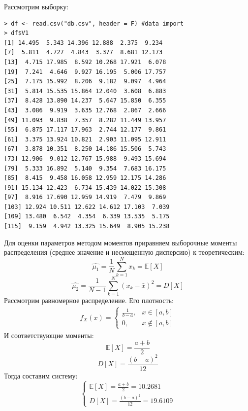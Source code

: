 \documentclass[14pt,a4paper]{scrartcl}
\begin{document}
Рассмотрим выборку:
\begin{verbatim}
> df <- read.csv("db.csv", header = F) #data import
> df$V1
[1] 14.495  5.343 14.396 12.888  2.375  9.234
[7]  5.811  4.727  4.843  3.377  8.681 12.173
[13]  4.715 17.985  8.592 10.268 17.921  6.078
[19]  7.241  4.646  9.927 16.195  5.006 17.757
[25]  7.175 15.992  8.206  9.182  9.097  4.964
[31]  5.814 15.535 15.864 12.040  3.608  6.883
[37]  8.428 13.890 14.237  5.647 15.850  6.355
[43]  3.086  9.919  3.635 12.768  2.867  2.666
[49] 11.093  9.838  7.357  8.282 11.449 13.957
[55]  6.875 17.117 17.963  2.744 12.177  9.861
[61]  3.375 13.924 10.821  2.903 11.095 12.911
[67]  3.878 10.351  8.250 14.186 15.506  5.743
[73] 12.906  9.012 12.767 15.988  9.493 15.694
[79]  5.333 16.892  5.140  9.354  7.683 16.175
[85]  8.415  9.458 16.058 12.959 12.175 14.286
[91] 15.134 12.423  6.734 15.439 14.022 15.308
[97]  8.916 17.690 12.959 14.919  7.479  9.869
[103] 12.924 10.511 12.622 14.612 17.103  7.039
[109] 13.480  6.542  4.354  6.339 13.535  5.175
[115]  9.159  4.942 13.325 15.649  8.905 15.238
\end{verbatim}


Для оценки параметров методом моментов приравняем выборочные моменты распределения (среднее значение и несмещенную дисперсию) к теоретическим:
\begin{equation*}
\hat{\mu_1} = \frac{1}{N}\sum_{k=1}^{N}x_k = \mathbb{E}[X]
\end{equation*}
\begin{equation*}
\hat{\mu_2} = \frac{1}{N-1}\sum_{k=1}^{N}(x_k-\bar{x})^2 = D[X]
\end{equation*}
Рассмотрим равномерное распределение. Его плотность:
\begin{align*}
f_{X}(x)=\left\{\begin{array}{cc}{\frac{1}{b-a},} & {x \in[a, b]} \\ {0,} & {x \notin[a, b]}\end{array}\right.
\end{align*}
И соответствующие моменты:
\begin{equation*}
\mathbb{E}[X] = \frac{a+b}{2}
\end{equation*}
\begin{equation*}
D[X] = \frac{(b-a)^2}{12}
\end{equation*}
Тогда составим систему: \\
\begin{equation*}
\begin{cases*}
\mathbb{E}[X] = \frac{a+b}{2} = 10.2681 \\
D[X] = \frac{(b-a)^2}{12} = 19.6109
\end{cases*}
\end{equation*}
\end{document}
